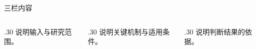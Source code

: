 \begin{frame}{三栏内容}
  \begin{columns}[T,onlytextwidth]
    \begin{column}{.30\textwidth}
      说明输入与研究范围。
    \end{column}
    \begin{column}{.30\textwidth}
      说明关键机制与适用条件。
    \end{column}
    \begin{column}{.30\textwidth}
      说明判断结果的依据。
    \end{column}
  \end{columns}
\end{frame}
